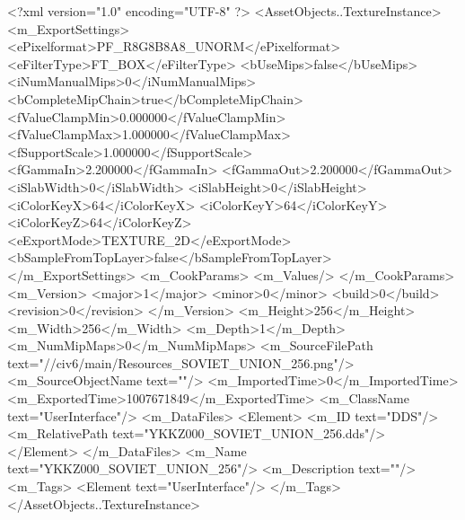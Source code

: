 <?xml version="1.0" encoding="UTF-8" ?>
<AssetObjects..TextureInstance>
	<m_ExportSettings>
		<ePixelformat>PF_R8G8B8A8_UNORM</ePixelformat>
		<eFilterType>FT_BOX</eFilterType>
		<bUseMips>false</bUseMips>
		<iNumManualMips>0</iNumManualMips>
		<bCompleteMipChain>true</bCompleteMipChain>
		<fValueClampMin>0.000000</fValueClampMin>
		<fValueClampMax>1.000000</fValueClampMax>
		<fSupportScale>1.000000</fSupportScale>
		<fGammaIn>2.200000</fGammaIn>
		<fGammaOut>2.200000</fGammaOut>
		<iSlabWidth>0</iSlabWidth>
		<iSlabHeight>0</iSlabHeight>
		<iColorKeyX>64</iColorKeyX>
		<iColorKeyY>64</iColorKeyY>
		<iColorKeyZ>64</iColorKeyZ>
		<eExportMode>TEXTURE_2D</eExportMode>
		<bSampleFromTopLayer>false</bSampleFromTopLayer>
	</m_ExportSettings>
	<m_CookParams>
		<m_Values/>
	</m_CookParams>
	<m_Version>
		<major>1</major>
		<minor>0</minor>
		<build>0</build>
		<revision>0</revision>
	</m_Version>
	<m_Height>256</m_Height>
	<m_Width>256</m_Width>
	<m_Depth>1</m_Depth>
	<m_NumMipMaps>0</m_NumMipMaps>
	<m_SourceFilePath text="//civ6/main/Resources_SOVIET_UNION_256.png"/>
	<m_SourceObjectName text=""/>
	<m_ImportedTime>0</m_ImportedTime>
	<m_ExportedTime>1007671849</m_ExportedTime>
	<m_ClassName text="UserInterface"/>
	<m_DataFiles>
		<Element>
			<m_ID text="DDS"/>
			<m_RelativePath text="YKKZ000_SOVIET_UNION_256.dds"/>
		</Element>
	</m_DataFiles>
	<m_Name text="YKKZ000_SOVIET_UNION_256"/>
	<m_Description text=""/>
	<m_Tags>
		<Element text="UserInterface"/>
	</m_Tags>
</AssetObjects..TextureInstance>

